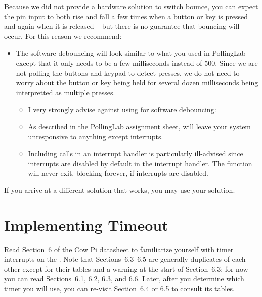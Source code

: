 Because we did not provide a hardware solution to switch bounce, you can expect
the pin input to both rise and fall a few times when a button or key is
pressed and again when it is released -- but there is no guarantee that
bouncing will occur. For this reason we recommend:
    \begin{itemize}
    \item The software debouncing will look similar to what you used in
        PollingLab except that it only needs to be a few milliseconds instead
        of 500. Since we are not polling the buttons and keypad to detect
        presses, we do not need to worry about the button or key being held for
        several dozen milliseconds being interpretted as multiple presses.
        \begin{itemize}
        \item I very strongly advise against using  for
            software debouncing:
        \item As described in the PollingLab assignment sheet,
             will leave your system unresponsive to anything
            except interrupts.
        \item Including  calls in an interrupt handler is particularly ill-advised since interrupts are disabled by default in the interrupt handler. The  function will never exit, blocking forever, if interrupts are disabled.
        \end{itemize}
    \end{itemize}
If you arrive at a different solution that works, you may use your solution.



\section{Implementing Timeout}\label{sec:TimerInterrupts}

Read Section~6 of the Cow Pi datasheet to familiarize yourself with timer interrupts on the \developmentboard.
Note that Sections~6.3--6.5 are generally duplicates of each other except for their tables and a warning at the start of Section~6.3;
for now you can read Sections~6.1, 6.2, 6.3, and 6.6.
Later, after you determine which timer you will use, you can re-visit Section~6.4 or 6.5 to consult its tables.


